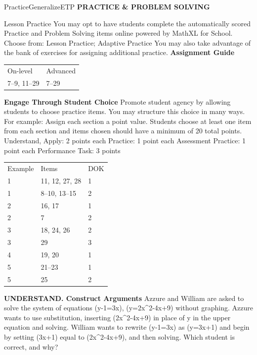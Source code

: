 \documentclass{article}
\newenvironment{item-analysis}{}{}      %
\newenvironment{practice}[2]{}{}        %
\newenvironment{te-addendum}[2]{}{}     %
\newcommand{\answer}[1]{}               %
\newcommand{\te}[1]{}                   %
\begin{document}
\begin{te-addendum}{Practice}{GeneralizeETP}
\textbf{PRACTICE \& PROBLEM SOLVING}
\te{Practice \& Problem Solving and video tutorials are available at SavvasRealize.com. Scan the QR code to access a video tutorial.}
Lesson Practice You may opt to have students complete the automatically scored Practice and Problem Solving items online powered by MathXL for School.
Choose from: Lesson Practice; Adaptive Practice
You may also take advantage of the bank of exercises for assigning additional practice.
\textbf{Assignment Guide}
\begin{tabular}{ll}
On-level & Advanced \\
7--9, 11--29 & 7--29 \\
\end{tabular}
\textbf{Engage Through Student Choice}
Promote student agency by allowing students to choose practice items. You may structure this choice in many ways.
For example:
Assign each section a point value. Students choose at least one item from each section and items chosen should have a minimum of 20 total points.
Understand, Apply: 2 points each
Practice: 1 point each
Assessment Practice: 1 point each
Performance Task: 3 points
\end{te-addendum}
\begin{item-analysis}
\begin{tabular}{lll}
Example & Items & DOK \\
1 & 11, 12, 27, 28 & 1 \\
1 & 8--10, 13--15 & 2 \\
2 & 16, 17 & 1 \\
2 & 7 & 2 \\
3 & 18, 24, 26 & 2 \\
3 & 29 & 3 \\
4 & 19, 20 & 1 \\
5 & 21--23 & 1 \\
5 & 25 & 2 \\
\end{tabular}
\end{item-analysis}
\begin{practice}{7}{2}
\textbf{UNDERSTAND. Construct Arguments} Azzure and William are asked to solve the system of equations (y-1=3x), (y=2x^2-4x+9) without graphing.
Azzure wants to use substitution, inserting (2x^2-4x+9) in place of y in the upper equation and solving. William wants to rewrite (y-1=3x) as (y=3x+1) and begin by setting (3x+1) equal to (2x^2-4x+9), and then solving. Which student is correct, and why?
\answer{Both methods are correct, since both reduce the system to one quadratic equation which can then be solved for x.}
\end{practice}
\end{document}
